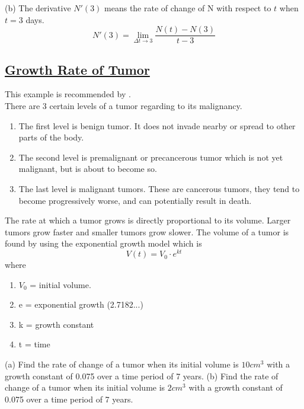 \begin{flushleft}
(b) The derivative $N'(3)$ means the rate of change of N with respect to $t$ when $t=3$ days.
	$$
		N'(3) = \lim_{\Delta t \to 3} \frac{N(t) - N(3)}{t - 3}
	$$
\end{flushleft}

\subsection{\href{https://www.slideshare.net/ichazalia/derivative-application-in-medical-and-biology}{Growth Rate of Tumor}}

\begin{flushleft}
This example is recommended by \cite{azalia}.\\
There are 3 certain levels of a tumor regarding to its malignancy.
\begin{enumerate}
    \item The first level is benign tumor. It does not invade nearby or spread to other parts of the body.
    \item The second level is premalignant or precancerous tumor which is not yet malignant, but is about to become so.
    \item The last level is malignant tumors. These are cancerous tumors, they tend to become progressively worse, and can potentially result in death.
\end{enumerate}

The rate at which a tumor grows is directly proportional to its volume. Larger tumors grow faster and smaller tumors grow slower.
The volume of a tumor is found by using the exponential growth model which is
	$$
		V(t) = V_0 \cdot e^{kt}
	$$
	where
	
\begin{enumerate}
    \item $V_0$ = initial volume.
    \item e     = exponential growth (2.7182...)
    \item k     = growth constant
    \item t     = time
\end{enumerate}

(a) Find the rate of change of a tumor when its initial volume is $10cm^3$ with a growth constant of 0.075 over a time period of 7 years.\bigbreak
(b) Find the rate of change of a tumor when its initial volume is $2cm^3$ with a growth constant of 0.075 over a time period of 7 years.
\end{flushleft}


